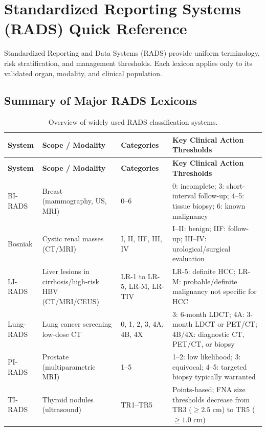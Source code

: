 \chapter{Standardized Reporting Systems (RADS) Quick Reference}
\label{app:reporting_rads}

Standardized Reporting and Data Systems (RADS) provide uniform terminology, risk stratification, and management thresholds. Each lexicon applies only to its validated organ, modality, and clinical population.

\section{Summary of Major RADS Lexicons}

\begin{longtable}{@{}p{}p{}p{}p{}@{}}
\caption{Overview of widely used RADS classification systems.}
\label{tab:app_rads_summary} \\
\toprule
\textbf{System} & \textbf{Scope / Modality} & \textbf{Categories} & \textbf{Key Clinical Action Thresholds} \\
\midrule
\endfirsthead
\toprule
\textbf{System} & \textbf{Scope / Modality} & \textbf{Categories} & \textbf{Key Clinical Action Thresholds} \\
\midrule
\endhead
BI-RADS & Breast (mammography, US, MRI) & 0--6 & 0: incomplete; 3: short-interval follow-up; 4--5: tissue biopsy; 6: known malignancy \\
Bosniak & Cystic renal masses (CT/MRI) & I, II, IIF, III, IV & I--II: benign; IIF: follow-up; III--IV: urological/surgical evaluation \\
LI-RADS & Liver lesions in cirrhosis/high-risk HBV (CT/MRI/CEUS) & LR-1 to LR-5, LR-M, LR-TIV & LR-5: definite HCC; LR-M: probable/definite malignancy not specific for HCC \\
Lung-RADS & Lung cancer screening low-dose CT & 0, 1, 2, 3, 4A, 4B, 4X & 3: 6-month LDCT; 4A: 3-month LDCT or PET/CT; 4B/4X: diagnostic CT, PET/CT, or biopsy \\
PI-RADS & Prostate (multiparametric MRI) & 1--5 & 1--2: low likelihood; 3: equivocal; 4--5: targeted biopsy typically warranted \\
TI-RADS & Thyroid nodules (ultrasound) & TR1--TR5 & Points-based; FNA size thresholds decrease from TR3 ($\geq 2.5$ cm) to TR5 ($\geq 1.0$ cm) \\
\bottomrule
\end{longtable}

